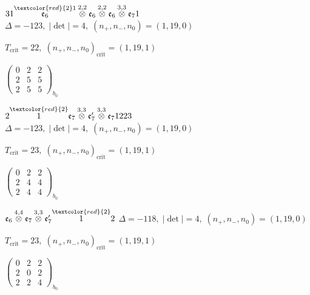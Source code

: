 \documentclass[10pt]{article}
\begin{document}
$31\overset{\textcolor{red}{2}1}{\mathfrak{e}_6}\overset{2,2}{\otimes}\mathfrak{e}_6\overset{2,2}{\otimes}\mathfrak{e}_6\overset{3,3}{\otimes}\mathfrak{e}_71$ \quad $\Delta=-123,\; |\det|=4,\; (n_+,n_-,n_0)=(1,19,0)$

\hspace{1em}$T_{\text{crit}}=22,\; (n_+,n_-,n_0)_{\text{crit}}=(1,19,1)$

\hspace{2em}$\left(\begin{smallmatrix}0 & 2 & 2 \\ 2 & 5 & 5 \\ 2 & 5 & 5\end{smallmatrix}\right)_{\!b_0}$

\smallskip

$2\overset{\textcolor{red}{2}}{1}\mathfrak{e}_7\overset{3,3}{\otimes}\mathfrak{e}_7'\overset{3,3}{\otimes}\mathfrak{e}_71223$ \quad $\Delta=-123,\; |\det|=4,\; (n_+,n_-,n_0)=(1,19,0)$

\hspace{1em}$T_{\text{crit}}=23,\; (n_+,n_-,n_0)_{\text{crit}}=(1,19,1)$

\hspace{2em}$\left(\begin{smallmatrix}0 & 2 & 2 \\ 2 & 4 & 4 \\ 2 & 4 & 4\end{smallmatrix}\right)_{\!b_0}$

\smallskip

$\mathfrak{e}_6\overset{4,4}{\otimes}\mathfrak{e}_7\overset{3,3}{\otimes}\mathfrak{e}_7'\overset{\textcolor{red}{2}}{1}2$ \quad $\Delta=-118,\; |\det|=4,\; (n_+,n_-,n_0)=(1,19,0)$

\hspace{1em}$T_{\text{crit}}=23,\; (n_+,n_-,n_0)_{\text{crit}}=(1,19,1)$

\hspace{2em}$\left(\begin{smallmatrix}0 & 2 & 2 \\ 2 & 0 & 2 \\ 2 & 2 & 4\end{smallmatrix}\right)_{\!b_0}$

\smallskip
\end{document}
